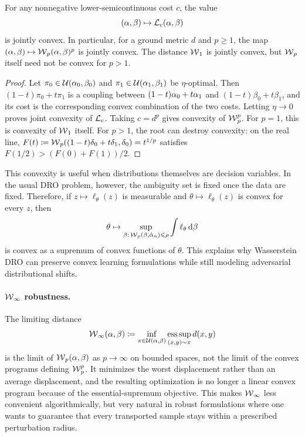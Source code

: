 \begin{prop}\label{prop-wasserstein-cost-convex}
	For any nonnegative lower-semicontinuous cost $c$, the value
	\[
		(\alpha,\beta)\mapsto\mathcal{L}_c(\alpha,\beta)
	\]
	is jointly convex. In particular, for a ground metric $d$ and $p\geq1$, the map $(\alpha,\beta)\mapsto\operatorname{\mathcal{W}}_p(\alpha,\beta)^p$ is jointly convex. The distance $\operatorname{\mathcal{W}}_1$ is jointly convex, but $\operatorname{\mathcal{W}}_p$ itself need not be convex for $p>1$.
\end{prop}
\begin{proof}
	Let $\pi_0\in\mathcal{U}(\alpha_0,\beta_0)$ and $\pi_1\in\mathcal{U}(\alpha_1,\beta_1)$ be $\eta$-optimal. Then $(1-t)\pi_0+t\pi_1$ is a coupling between $(1-t)\alpha_0+t\alpha_1$ and $(1-t)\beta_0+t\beta_1$, and its cost is the corresponding convex combination of the two costs. Letting $\eta\to0$ proves joint convexity of $\mathcal{L}_c$. Taking $c=d^p$ gives convexity of $\operatorname{\mathcal{W}}_p^p$. For $p=1$, this is convexity of $\operatorname{\mathcal{W}}_1$ itself. For $p>1$, the root can destroy convexity: on the real line, $F(t)\coloneqq\operatorname{\mathcal{W}}_p((1-t)\delta_0+t\delta_1,\delta_0)=t^{1/p}$ satisfies $F(1/2)> (F(0)+F(1))/2$.
\end{proof}

This convexity is useful when distributions themselves are decision variables. In the usual DRO problem, however, the ambiguity set is fixed once the data are fixed. Therefore, if $z\mapsto\ell_\theta(z)$ is measurable and $\theta\mapsto\ell_\theta(z)$ is convex for every $z$, then
\[
	\theta\mapsto
	\sup_{\beta:\,\operatorname{\mathcal{W}}_p(\beta,\hat\alpha_n)\leqslant\rho}
	\int \ell_\theta\,\mathrm{d}\beta
\]
is convex as a supremum of convex functions of $\theta$. This explains why Wasserstein DRO can preserve convex learning formulations while still modeling adversarial distributional shifts.

\paragraph{\texorpdfstring{$\operatorname{\mathcal{W}}_\infty$}{W-infinity} robustness.}

The limiting distance
\begin{equation}\label{eq-wass-infty}
	\operatorname{\mathcal{W}}_\infty(\alpha,\beta)
	\coloneqq
	\inf_{\pi\in\mathcal{U}(\alpha,\beta)}
	\operatorname*{ess\,sup}_{(x,y)\sim\pi} d(x,y)
\end{equation}
is the limit of $\operatorname{\mathcal{W}}_p(\alpha,\beta)$ as $p\to\infty$ on bounded spaces, not the limit of the convex programs defining $\operatorname{\mathcal{W}}_p^p$. It minimizes the worst displacement rather than an average displacement, and the resulting optimization is no longer a linear convex program because of the essential-supremum objective. This makes $\operatorname{\mathcal{W}}_\infty$ less convenient algorithmically, but very natural in robust formulations where one wants to guarantee that every transported sample stays within a prescribed perturbation radius.

